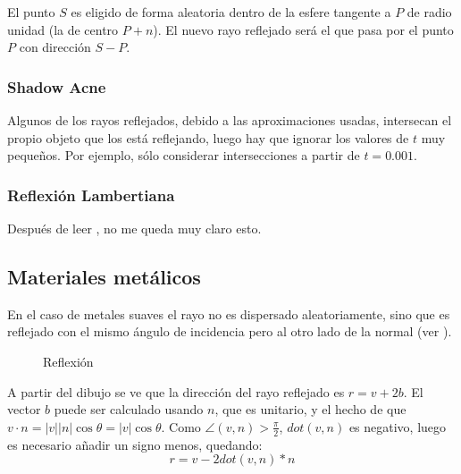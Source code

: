\documentclass[12pt]{article}
\theoremstyle{definition}
\theoremstyle{remark}
\begin{document}
El punto $S$ es eligido de forma aleatoria dentro de la esfere tangente a $P$ de radio unidad (la de centro $P+n$). El nuevo rayo reflejado será el que pasa por el punto $P$ con dirección $S-P$.

\subsubsection{Shadow Acne}

Algunos de los rayos reflejados, debido a las aproximaciones usadas, intersecan el propio objeto que los está reflejando, luego hay que ignorar los valores de $t$ muy pequeños. Por ejemplo, sólo considerar intersecciones a partir de $t=0.001$.

\subsubsection{Reflexión Lambertiana}

Después de leer \cite{lambertian}, no me queda muy claro esto.

\subsection{Materiales metálicos}

En el caso de metales suaves el rayo no es dispersado aleatoriamente, sino que es reflejado con el mismo ángulo de incidencia pero al otro lado de la normal (ver \cite{beam}).

\begin{figure}[H]
\centering
{}
\caption{Reflexión}
\end{figure}

A partir del dibujo se ve que la dirección del rayo reflejado es $r=v+2b$. El vector $b$ puede ser calculado usando $n$, que es unitario, y el hecho de que $v\cdot n=|v||n|\cos\theta=|v|\cos\theta$. Como $\angle (v,n)> \frac{\pi}{2}$, $dot(v,n)$ es negativo, luego es necesario añadir un signo menos, quedando:
\[
r=v-2dot(v,n)*n
\]
\end{document}
